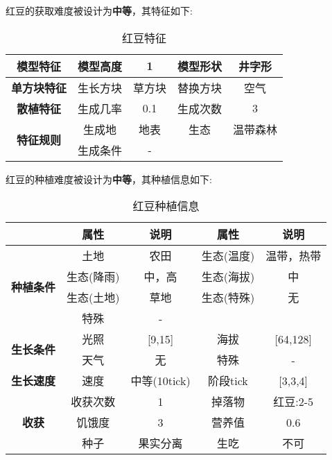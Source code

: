 红豆的获取难度被设计为\textbf{中等}，其特征如下:
\begin{table}[H]
    \centering
    \caption{红豆特征}
    \label{table:红豆特征}
    \setlength{\tabcolsep}{4mm}
    \begin{tabular}{c|cc|cc}
        \toprule
        \textbf{模型特征}                  & 模型高度 & 1      & 模型形状 & 井字形 \\
        \midrule
        \textbf{单方块特征}                & 生长方块 & 草方块 & 替换方块 & 空气   \\
        \midrule
        \textbf{散植特征}                  & 生成几率 & 0.1    & 生成次数 & 3      \\
        \midrule
        \multirow{2}{*}{\textbf{特征规则}} & 生成地   & 地表   & 生态     & 温带森林   \\
                                           & 生成条件 & -              \\
        \bottomrule
    \end{tabular}
\end{table}


红豆的种植难度被设计为\textbf{中等}，其种植信息如下:

\begin{table}[H]
    \centering
    \caption{红豆种植信息}
    \label{table:红豆种植信息}
    \setlength{\tabcolsep}{4mm}
    \begin{tabular}{c|cc|cc}
        \toprule
                                           & \textbf{属性} & \textbf{说明}   & \textbf{属性} & \textbf{说明} \\
        \midrule
        \multirow{4}{*}{\textbf{种植条件}} & 土地          & 农田            & 生态(温度)    & 温带，热带    \\
                                           & 生态(降雨)    & 中，高          & 生态(海拔)    & 中            \\
                                           & 生态(土地)    & 草地            & 生态(特殊)    & 无            \\
                                           & 特殊          & -                                 \\
        \midrule
        \multirow{2}{*}{\textbf{生长条件}} & 光照          & [9,15]         & 海拔          & [64,128]      \\
                                           & 天气          & 无              & 特殊          & -      \\
        \midrule
        \textbf{生长速度}                  & 速度          & 中等(10tick)       & 阶段tick      & [3,3,4]       \\
        \midrule
        \multirow{3}{*}{\textbf{收获}}     & 收获次数      & 1               & 掉落物        & 红豆:2-5      \\
                                           & 饥饿度        & 3               & 营养值        & 0.6           \\
                                           & 种子          & 果实分离        & 生吃          & 不可          \\
        \bottomrule
    \end{tabular}
\end{table}

